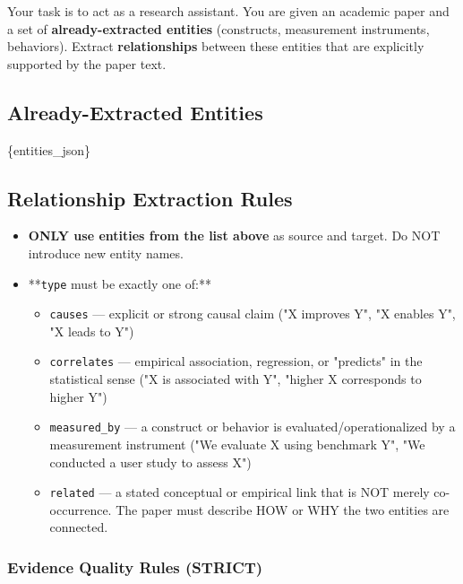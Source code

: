 \begin{tcolorbox}[breakable,enhanced,colback=blue!3,colframe=blue!40!black,title={Prompt},fonttitle=\bfseries,left=8pt,right=8pt,top=6pt,bottom=6pt]

Your task is to act as a research assistant. You are given an academic paper and a set of \textbf{already-extracted entities} (constructs, measurement instruments, behaviors). Extract \textbf{relationships} between these entities that are explicitly supported by the paper text.

\subsection*{Already-Extracted Entities}

\{entities\_json\}

\subsection*{Relationship Extraction Rules}

\begin{itemize}
\item \textbf{ONLY use entities from the list above} as source and target. Do NOT introduce new entity names.
\item **\texttt{type} must be exactly one of:**
\begin{itemize}
\item \texttt{causes} --- explicit or strong causal claim ("X improves Y", "X enables Y", "X leads to Y")
\item \texttt{correlates} --- empirical association, regression, or "predicts" in the statistical sense ("X is associated with Y", "higher X corresponds to higher Y")
\item \texttt{measured\_by} --- a construct or behavior is evaluated/operationalized by a measurement instrument ("We evaluate X using benchmark Y", "We conducted a user study to assess X")
\item \texttt{related} --- a stated conceptual or empirical link that is NOT merely co-occurrence. The paper must describe HOW or WHY the two entities are connected.
\end{itemize}
\end{itemize}

\subsubsection*{Evidence Quality Rules (STRICT)}


\end{tcolorbox}
